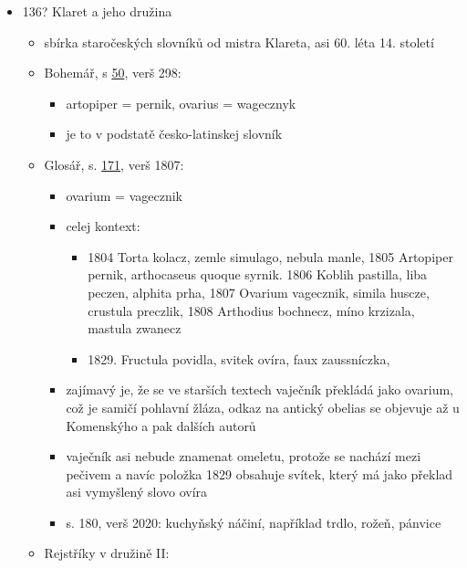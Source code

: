 \begin{itemize}
\tightlist
\item
  136? Klaret a jeho družina

  \begin{itemize}
  \tightlist
  \item
    sbírka staročeských slovníků od mistra Klareta, asi 60. léta 14.
    století
  \item
    Bohemář, s
    \href{https://sources.cms.flu.cas.cz/src/index.php?s=v&bookid=832&page=84}{50},
    verš 298:

    \begin{itemize}
    \tightlist
    \item
      artopiper = pernik, ovarius = wagecznyk
    \item
      je to v podstatě česko-latinskej slovník
    \end{itemize}
  \item
    Glosář, s.
    \href{https://nlp.fi.muni.cz/projekty/ahisto/portal/book/832?lpage=171&search=vage}{171},
    verš 1807:

    \begin{itemize}
    \tightlist
    \item
      ovarium = vagecznik
    \item
      celej kontext:

      \begin{itemize}
      \tightlist
      \item
        1804 Torta kolacz, zemle simulago, nebula manle, 1805 Artopiper
        pernik, arthocaseus quoque syrnik. 1806 Koblih pastilla, liba
        peczen, alphita prha, 1807 Ovarium vagecznik, simila huscze,
        crustula preczlik, 1808 Arthodius bochnecz, míno krzizala,
        mastula zwanecz
      \item
        1829. Fructula povidla, svitek ovíra, faux zaussníczka,
      \end{itemize}
    \item
      zajímavý je, že se ve starších textech vaječník překládá jako
      ovarium, což je samičí pohlavní žláza, odkaz na antický obelias se
      objevuje až u Komenskýho a pak dalších autorů
    \item
      vaječník asi nebude znamenat omeletu, protože se nachází mezi
      pečivem a navíc položka 1829 obsahuje svítek, který má jako
      překlad asi vymyšlený slovo ovíra
    \item
      s. 180, verš 2020: kuchyňský náčiní, například trdlo, rožeň,
      pánvice
    \end{itemize}
  \item
    Rejstříky v družině II:


\end{itemize}
\end{itemize}
